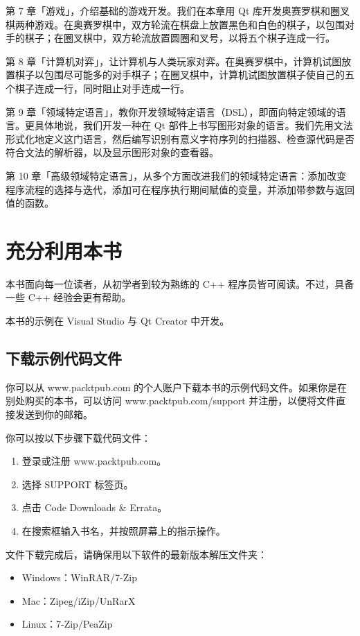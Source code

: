 第 7 章「游戏」，介绍基础的游戏开发。我们在本章用 Qt 库开发奥赛罗棋和圈叉棋两种游戏。在奥赛罗棋中，双方轮流在棋盘上放置黑色和白色的棋子，以包围对手的棋子；在圈叉棋中，双方轮流放置圆圈和叉号，以将五个棋子连成一行。

第 8 章「计算机对弈」，让计算机与人类玩家对弈。在奥赛罗棋中，计算机试图放置棋子以包围尽可能多的对手棋子；在圈叉棋中，计算机试图放置棋子使自己的五个棋子连成一行，同时阻止对手连成一行。

第 9 章「领域特定语言」，教你开发领域特定语言（DSL），即面向特定领域的语言。更具体地说，我们开发一种在 Qt 部件上书写图形对象的语言。我们先用文法形式化地定义这门语言，然后编写识别有意义字符序列的扫描器、检查源代码是否符合文法的解析器，以及显示图形对象的查看器。

第 10 章「高级领域特定语言」，从多个方面改进我们的领域特定语言：添加改变程序流程的选择与迭代，添加可在程序执行期间赋值的变量，并添加带参数与返回值的函数。

\section*{充分利用本书}

本书面向每一位读者，从初学者到较为熟练的 C++ 程序员皆可阅读。不过，具备一些 C++ 经验会更有帮助。

本书的示例在 Visual Studio 与 Qt Creator 中开发。

\subsection*{下载示例代码文件}

你可以从 www.packtpub.com 的个人账户下载本书的示例代码文件。如果你是在别处购买的本书，可以访问 www.packtpub.com/support 并注册，以便将文件直接发送到你的邮箱。

你可以按以下步骤下载代码文件：

\begin{enumerate}
\item 登录或注册 www.packtpub.com。
\item 选择 SUPPORT 标签页。
\item 点击 Code Downloads \& Errata。
\item 在搜索框输入书名，并按照屏幕上的指示操作。
\end{enumerate}

文件下载完成后，请确保用以下软件的最新版本解压文件夹：

\begin{itemize}
\item Windows：WinRAR/7-Zip
\item Mac：Zipeg/iZip/UnRarX
\item Linux：7-Zip/PeaZip
\end{itemize}

